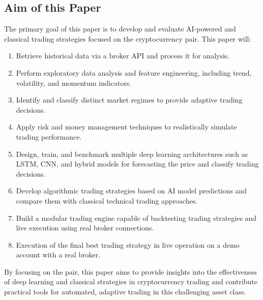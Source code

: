 \subsection{Aim of this Paper}

The primary goal of this paper is to develop and evaluate AI-powered and classical trading strategies focused on the \ethusdc cryptocurrency pair.
This paper will:

\begin{enumerate}
    \item Retrieve historical \ethusdc data via a broker API and process it for analysis.
    \item Perform exploratory data analysis and feature engineering, including trend, volatility, and momentum indicators.
    \item Identify and classify distinct market regimes to provide adaptive trading decisions.
    \item Apply risk and money management techniques to realistically simulate trading performance.
    \item Design, train, and benchmark multiple deep learning architectures such as LSTM, CNN, and hybrid models for forecasting the price and classify trading decisions.
    \item Develop algorithmic trading strategies based on AI model predictions and compare them with classical technical trading approaches.
    \item Build a modular trading engine capable of backtesting trading strategies and live execution using real broker connections.
    \item Execution of the final best trading strategy in live operation on a demo account with a real broker.
\end{enumerate}

\noindent
By focusing on the \ethusdc pair, this paper aims to provide insights into the effectiveness of deep learning and classical strategies in cryptocurrency trading and contribute practical tools for automated, adaptive trading in this challenging asset class.
